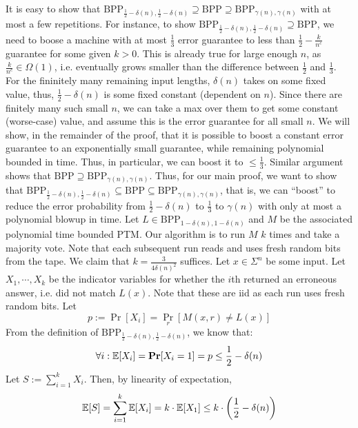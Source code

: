 \documentclass[12pt]{article}
\begin{document}
\begin{solution}
    It is easy to show that $\text{BPP}_{\frac{1}{2}-\delta(n), \frac{1}{2}-\delta(n)} \supseteq \text{BPP} \supseteq \text{BPP}_{\gamma(n), \gamma(n)}$ with at most a few repetitions. For instance, to show $\text{BPP}_{\frac{1}{2}-\delta(n), \frac{1}{2}-\delta(n)} \supseteq \text{BPP}$, we need to boose a machine with at most $\frac{1}{3}$ error guarantee to less than $\frac{1}{2} - \frac{k}{n^c}$ guarantee for some given $k > 0$. This is already true for large enough $n$, as $\frac{k}{n^c} \in \Omega(1)$, i.e. eventually grows smaller than the difference between $\frac{1}{2}$ and $\frac{1}{3}$. For the fininitely many remaining input lengths, $\delta(n)$ takes on some fixed value, thus, $\frac{1}{2}-\delta(n)$ is some fixed constant (dependent on $n$). Since there are finitely many such small $n$, we can take a max over them to get some constant (worse-case) value, and assume this is the error guarantee for all small $n$. We will show, in the remainder of the proof, that it is possible to boost a constant error guarantee to an exponentially small guarantee, while remaining polynomial bounded in time. Thus, in particular, we can boost it to $\leq \frac{1}{3}$. Similar argument shows that $\text{BPP} \supseteq \text{BPP}_{\gamma(n), \gamma(n)}$. \bbni
    Thus, for our main proof, we want to show that $\text{BPP}_{\frac{1}{2}-\delta(n), \frac{1}{2}-\delta(n)} \subseteq \text{BPP} \subseteq \text{BPP}_{\gamma(n), \gamma(n)}$, that is, we can ``boost'' to reduce the error probability from $\frac{1}{2}-\delta(n)$ to $\frac{1}{3}$ to $\gamma(n)$ with only at most a polynomial blowup in time. \bbni
    Let $L \in \text{BPP}_{1-\delta(n), 1-\delta(n)}$ and $M$ be the associated polynomial time bounded PTM. Our algorithm is to run $M$ $k$ times and take a majority vote. Note that each subsequent run reads and uses fresh random bits from the tape. We claim that $k = \frac{3}{4\delta(n)^2}$ suffices. \bbni
    Let $x \in \Sigma^n$ be some input. Let $X_1, \cdots, X_k$ be the indicator variables for whether the $i$th returned an erroneous answer, i.e. did not match $L(x)$. Note that these are iid as each run uses fresh random bits. Let 
    \[ p := \Pr[X_i] = \Pr_r[M(x, r) \neq L(x)]\] 
    From the definition of $\text{BPP}_{\frac{1}{2}-\delta(n), \frac{1}{2}-\delta(n)}$, we know that:
    \[ \forall i: \operatorname{\mathbb{E}}[X_i] = \operatorname{\mathbf{Pr}}[X_i = 1] = p \leq \frac{1}{2} - \delta(n)\]
    Let $S := \sum_{i = 1}^k X_i$. Then, by linearity of expectation, 
    \[ \operatorname{\mathbb{E}}[S] = \sum_{i=1}^k \operatorname{\mathbb{E}}[X_i] = k \cdot \operatorname{\mathbb{E}}[X_1] \leq k \cdot \left(\frac{1}{2}-\delta(n)\right)\]

\end{solution}
\end{document}
